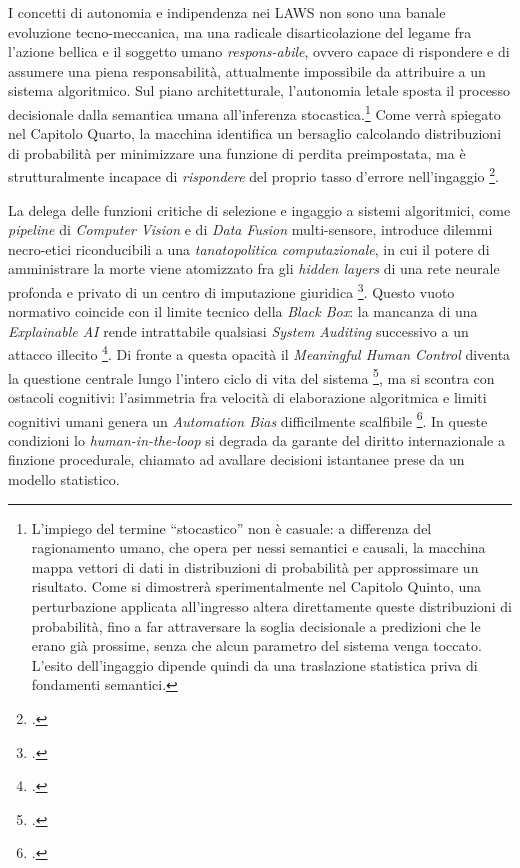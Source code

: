 \documentclass[a4paper,12pt]{report}
\begin{document}
I concetti di autonomia e indipendenza nei LAWS non sono una banale evoluzione
tecno-meccanica, ma una radicale disarticolazione del legame fra l'azione bellica
e il soggetto umano \textit{respons-abile}, ovvero capace di rispondere e di
assumere una piena responsabilità, attualmente impossibile da attribuire a un
sistema algoritmico. Sul piano architetturale, l'autonomia letale sposta il
processo decisionale dalla semantica umana all'inferenza stocastica.\footnote{L'impiego
del termine ``stocastico'' non è casuale: a differenza del ragionamento umano,
che opera per nessi semantici e causali, la macchina mappa vettori di dati in
distribuzioni di probabilità per approssimare un risultato. Come si dimostrerà
sperimentalmente nel Capitolo Quinto, una perturbazione applicata all'ingresso
altera direttamente queste distribuzioni di probabilità, fino a far attraversare
la soglia decisionale a predizioni che le erano già prossime, senza che alcun
parametro del sistema venga toccato. L'esito dell'ingaggio dipende quindi da una
traslazione statistica priva di fondamenti semantici.} Come verrà spiegato nel
Capitolo Quarto, la macchina identifica un bersaglio calcolando distribuzioni di
probabilità per minimizzare una funzione di perdita preimpostata, ma è
strutturalmente incapace di \textit{rispondere} del proprio tasso d'errore
nell'ingaggio \footcite{simmons_edler_2025}.

La delega delle funzioni critiche di selezione e ingaggio a sistemi algoritmici,
come \textit{pipeline} di \textit{Computer Vision} e di \textit{Data Fusion}
multi-sensore, introduce dilemmi necro-etici riconducibili a una
\textit{tanatopolitica computazionale}, in cui il potere di amministrare la morte
viene atomizzato fra gli \textit{hidden layers} di una rete neurale profonda e
privato di un centro di imputazione giuridica \footcite{buffa_2025}. Questo vuoto
normativo coincide con il limite tecnico della \textit{Black Box}: la mancanza di
una \textit{Explainable AI} rende intrattabile qualsiasi \textit{System Auditing}
successivo a un attacco illecito \footcite{wood_2024_xai, christie_2024}. Di
fronte a questa opacità il \textit{Meaningful Human Control} diventa la questione
centrale lungo l'intero ciclo di vita del sistema
\footcite{bode_2025, christie_2024}, ma si scontra con ostacoli cognitivi:
l'asimmetria fra velocità di elaborazione algoritmica e limiti cognitivi umani
genera un \textit{Automation Bias} difficilmente scalfibile
\footcite{horowitz_kahn_2024}. In queste condizioni lo \textit{human-in-the-loop}
si degrada da garante del diritto internazionale a finzione procedurale, chiamato
ad avallare decisioni istantanee prese da un modello statistico.
\end{document}
